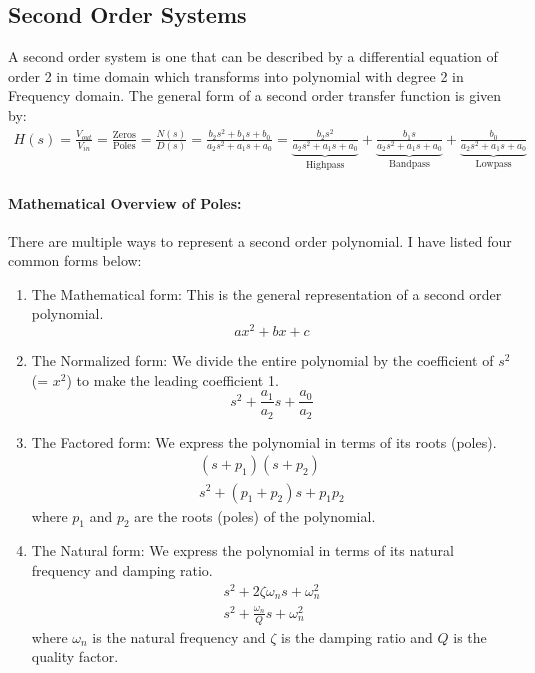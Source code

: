 \subsection{Second Order Systems}
\label{sec:theory_cs_second_order}

A second order system is one that can be described by a
differential equation of order 2 in time domain which
transforms into polynomial with degree 2 in Frequency
domain. The general form of a second order transfer
function is given by:
\begin{align*}
  H(s) = \frac{V_{out}}{V_{in}} = \frac{\text{Zeros}}{\text{Poles}} = \frac{N(s)}{D(s)} = \frac{b_2 s^2 + b_1 s + b_0}{a_2 s^2 + a_1 s + a_0} = \underbrace{\frac{b_2 s^2}{a_2 s^2+a_1 s+a_0}}_{\text{Highpass}} + \underbrace{\frac{b_1 s}{a_2 s^2+a_1 s+a_0}}_{\text{Bandpass}} + \underbrace{\frac{b_0}{a_2 s^2+a_1 s+a_0}}_{\text{Lowpass}}
\end{align*}

\paragraph{Mathematical Overview of Poles:}
There are multiple ways to represent a second order
polynomial. I have listed four common forms below:
\begin{enumerate}
  \item The Mathematical form: This is the general representation
    of a second order polynomial.
    \begin{equation*}
      a x^2 + b x + c
    \end{equation*}
  \item The Normalized form: We divide the entire polynomial
    by the coefficient of \( s^2 \) (= \( x^2 \)) to make
    the leading coefficient 1.
    \begin{equation*}
      s^2 + \frac{a_1}{a_2}s + \frac{a_0}{a_2}
    \end{equation*}
  \item The Factored form: We express the polynomial
    in terms of its roots (poles).
    \begin{align*}
      (s + p_1)(s + p_2) \\
      s^2 + (p_1 + p_2)s + p_1 p_2
    \end{align*}
    where \( p_1 \) and \( p_2 \) are the roots (poles) of the polynomial.
  \item The Natural form: We express the polynomial
    in terms of its natural frequency and damping ratio.
    \begin{align*}
      s^2 + 2 \zeta \omega_n s + \omega_n^2 \\
      s^2 + \frac{\omega_n}{Q} s + \omega_n^2
    \end{align*}
    where \( \omega_n \) is the natural frequency and \( \zeta \) is the
    damping ratio and \( Q\) is the quality factor.
\end{enumerate}

